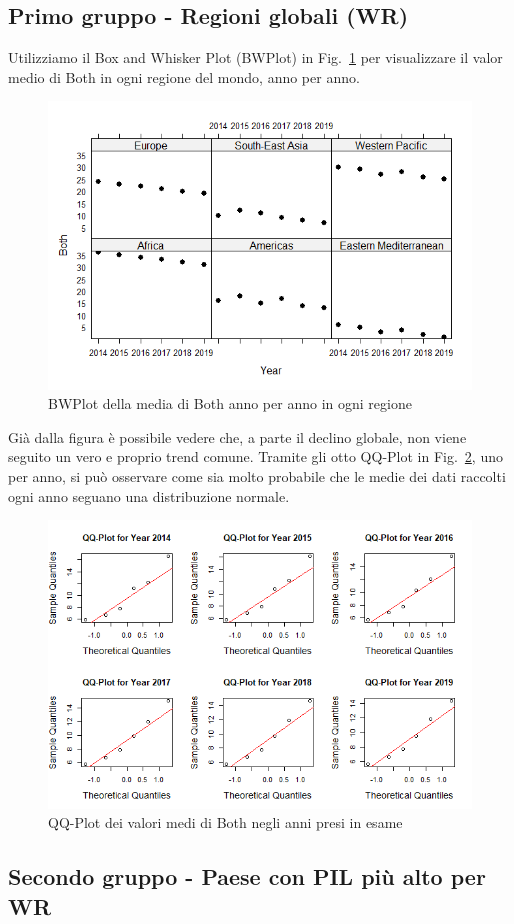 \documentclass[conference]{IEEEtran}
\begin{document}
\subsection{Primo gruppo - Regioni globali (WR)}
Utilizziamo il Box and Whisker Plot (BWPlot) in Fig.~\ref{5firstgroup} per visualizzare il
valor medio di Both in ogni regione del mondo, anno per anno.
\begin{figure}[htbp]
    \centerline{\includegraphics[width=.5\textwidth]{img/5 - Firstgroup.png}}
    \caption{BWPlot della media di Both anno per anno in ogni regione}
    \label{5firstgroup}
\end{figure}
Già dalla figura è possibile vedere che, a parte il declino globale, non viene seguito
un vero e proprio trend comune.
Tramite gli otto QQ-Plot in Fig.~\ref{6firstqq}, uno per anno, si può osservare come sia
molto probabile che le medie dei dati raccolti ogni anno seguano una distribuzione normale.
\begin{figure}[htbp]
    \centerline{\includegraphics[width=.5\textwidth]{img/6 - Firstqq.png}}
    \caption{QQ-Plot dei valori medi di Both negli anni presi in esame}
    \label{6firstqq}
\end{figure}

\subsection{Secondo gruppo - Paese con PIL più alto per WR}
\end{document}
